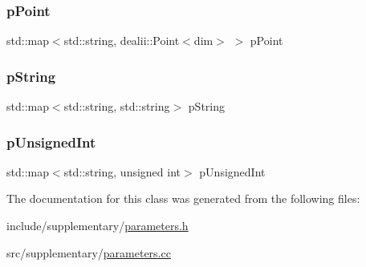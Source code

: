 \mbox{\label{classparameters_class_a619a83b172e412339a12ea402580662c}} 
\subsubsection{\texorpdfstring{pPoint}{pPoint}}
{\footnotesize\ttfamily std\+::map$<$std\+::string, dealii\+::\+Point$<$dim$>$ $>$ p\+Point\hspace{0.3cm}{\ttfamily [private]}}

\mbox{\label{classparameters_class_a3453601308e73bcc0f45ed6ea8a9959b}} 
\subsubsection{\texorpdfstring{pString}{pString}}
{\footnotesize\ttfamily std\+::map$<$std\+::string, std\+::string$>$ p\+String\hspace{0.3cm}{\ttfamily [private]}}

\mbox{\label{classparameters_class_a997bcb31fee3242f776c7e05d709ce12}} 
\subsubsection{\texorpdfstring{pUnsignedInt}{pUnsignedInt}}
{\footnotesize\ttfamily std\+::map$<$std\+::string, unsigned int$>$ p\+Unsigned\+Int\hspace{0.3cm}{\ttfamily [private]}}



The documentation for this class was generated from the following files\+:\begin{DoxyCompactItemize}
\item 
include/supplementary/\mbox{\hyperlink{parameters_8h}{parameters.\+h}}\item 
src/supplementary/\mbox{\hyperlink{parameters_8cc}{parameters.\+cc}}\end{DoxyCompactItemize}

